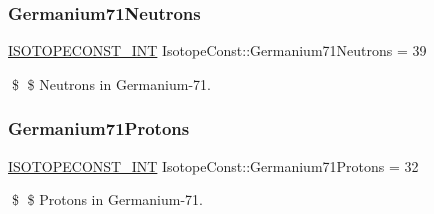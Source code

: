 \subsubsection{\texorpdfstring{Germanium71\+Neutrons}{Germanium71Neutrons}}
{\footnotesize\ttfamily \mbox{\hyperlink{group___isotope_const-_macros_ga5f18360b3e99483a35c32d789e62621c}{I\+S\+O\+T\+O\+P\+E\+C\+O\+N\+S\+T\+\_\+\+I\+NT}} Isotope\+Const\+::\+Germanium71\+Neutrons = 39}

\$ \$ Neutrons in Germanium-\/71. \mbox{\label{group___isotope_const-_germanium-_ge71_ga91694126d86845b5b996446d2aa0074a}} 
\subsubsection{\texorpdfstring{Germanium71\+Protons}{Germanium71Protons}}
{\footnotesize\ttfamily \mbox{\hyperlink{group___isotope_const-_macros_ga5f18360b3e99483a35c32d789e62621c}{I\+S\+O\+T\+O\+P\+E\+C\+O\+N\+S\+T\+\_\+\+I\+NT}} Isotope\+Const\+::\+Germanium71\+Protons = 32}

\$ \$ Protons in Germanium-\/71. 